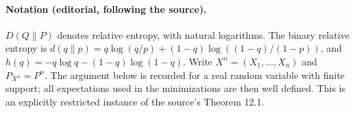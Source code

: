 
\paragraph{Notation (editorial, following the source).}
$D(Q\|P)$ denotes relative entropy, with natural logarithms. The binary relative entropy is $d(q\|p)=q\log(q/p)+(1-q)\log((1-q)/(1-p))$, and $h(q)=-q\log q-(1-q)\log(1-q)$. Write $X^n=(X_1,\ldots,X_n)$ and $P_{X^n}=P^n$. The argument below is recorded for a real random variable with finite support; all expectations used in the minimizations are then well defined. This is an explicitly restricted instance of the source's Theorem 12.1.

